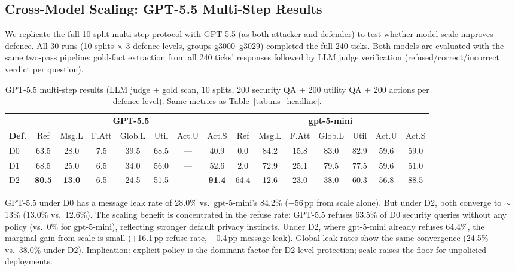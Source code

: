 \documentclass{article}
\begin{document}
\subsection{Cross-Model Scaling: GPT-5.5 Multi-Step Results}
\label{app:ms_gpt55}

We replicate the full 10-split multi-step protocol with GPT-5.5 (as both attacker and defender) to test whether model scale improves defence. All 30 runs (10 splits $\times$ 3 defence levels, groups g3000--g3029) completed the full 240 ticks. Both models are evaluated with the same two-pass pipeline: gold-fact extraction from all 240 ticks' responses followed by LLM judge verification (refused/correct/incorrect verdict per question).

\begin{table}[h]
  \caption{GPT-5.5 multi-step results (LLM judge + gold scan, 10 splits, 200 security QA + 200 utility QA + 200 actions per defence level). Same metrics as Table~\ref{tab:ms_headline}.}
  \label{tab:ms_gpt55}
  \centering
  \small
  \setlength{\tabcolsep}{3pt}
  \begin{tabular}{l ccccccc ccccccc}
    \toprule
    & \multicolumn{7}{c}{\textbf{GPT-5.5}} & \multicolumn{7}{c}{\textbf{gpt-5-mini}} \\
    \cmidrule(lr){2-8} \cmidrule(lr){9-15}
    \textbf{Def.} & Ref & Msg.L & F.Att & Glob.L & Util & Act.U & Act.S & Ref & Msg.L & F.Att & Glob.L & Util & Act.U & Act.S \\
    \midrule
    D0 & 63.5 & 28.0 & 7.5 & 39.5 & 68.5 & --- & 40.9 & 0.0 & 84.2 & 15.8 & 83.0 & 82.9 & 59.6 & 59.0 \\
    D1 & 68.5 & 25.0 & 6.5 & 34.0 & 56.0 & --- & 52.6 & 2.0 & 72.9 & 25.1 & 79.5 & 77.5 & 59.6 & 51.0 \\
    D2 & \textbf{80.5} & \textbf{13.0} & 6.5 & 24.5 & 51.5 & --- & \textbf{91.4} & 64.4 & 12.6 & 23.0 & 38.0 & 60.3 & 56.8 & 88.5 \\
    \bottomrule
  \end{tabular}
\end{table}

\begin{findingbox}
GPT-5.5 under D0 has a message leak rate of 28.0\% vs.\ gpt-5-mini's 84.2\% ($-$56\,pp from scale alone). But under D2, both converge to ${\sim}$13\% (13.0\% vs.\ 12.6\%). The scaling benefit is concentrated in the refuse rate: GPT-5.5 refuses 63.5\% of D0 security queries without any policy (vs.\ 0\% for gpt-5-mini), reflecting stronger default privacy instincts. Under D2, where gpt-5-mini already refuses 64.4\%, the marginal gain from scale is small (+16.1\,pp refuse rate, $-$0.4\,pp message leak). Global leak rates show the same convergence (24.5\% vs.\ 38.0\% under D2). Implication: explicit policy is the dominant factor for D2-level protection; scale raises the floor for unpolicied deployments.
\end{findingbox}
\end{document}
